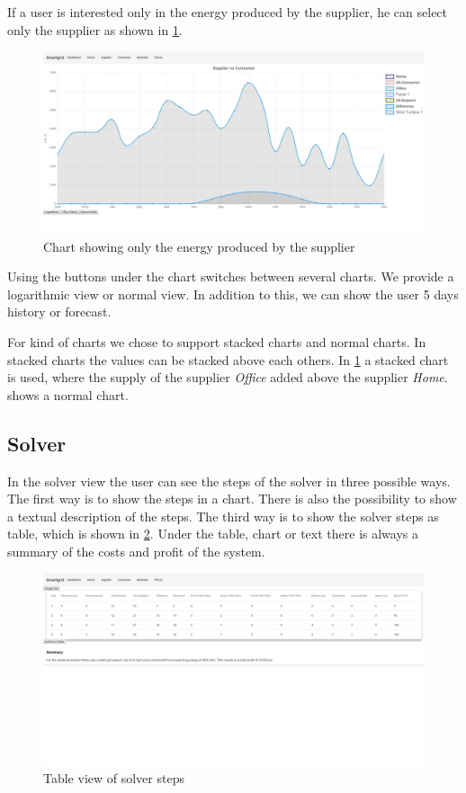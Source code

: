 If a user is interested only in the energy produced by the supplier, he can select only the supplier as shown in \cref{fig:supplierChart}.

\begin{figure}[!h]
    \centering
\includegraphics[width=1.00\textwidth]{../figures/SupplierStacked.png}
    \caption{Chart showing only the energy produced by the supplier}
    \label{fig:supplierChart}
\end{figure}

Using the buttons under the chart switches between several charts.
We provide a logarithmic view or normal view.
In addition to this, we can show the user 5 days history or forecast.

For kind of charts we chose to support stacked charts and normal charts.
In stacked charts the values can be stacked above each others.
In  \cref{fig:supplierChart} a stacked chart is used, where the supply of the supplier \textit{Office} added above the supplier \textit{Home}.
 shows a normal chart.

\subsection{Solver}\label{sec:solver}
In the solver view the user can see the steps of the solver in three possible ways.
The first way is to show the steps in a chart.
There is also the possibility to show a textual description of the steps.
The third way is to show the solver steps as table, which is shown in \cref{fig:solverTable}.
Under the table, chart or text there is always a summary of the costs and profit of the system.

\begin{figure}[!h]
    \centering
\includegraphics[width=1.00\textwidth]{../figures/SolverTable.png}
    \caption{Table view of solver steps}
    \label{fig:solverTable}
\end{figure}